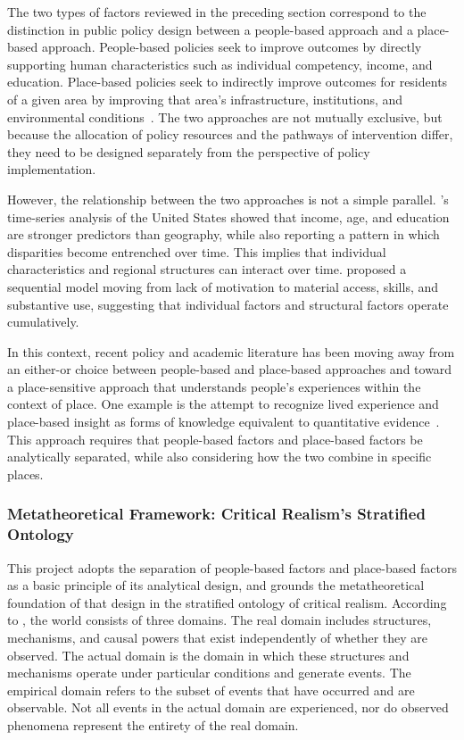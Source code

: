 The two types of factors reviewed in the preceding section correspond to the distinction in public policy design between a people-based approach and a place-based approach. People-based policies seek to improve outcomes by directly supporting human characteristics such as individual competency, income, and education. Place-based policies seek to indirectly improve outcomes for residents of a given area by improving that area's infrastructure, institutions, and environmental conditions~\citep{NeumarkSimpson2015}. The two approaches are not mutually exclusive, but because the allocation of policy resources and the pathways of intervention differ, they need to be designed separately from the perspective of policy implementation.

However, the relationship between the two approaches is not a simple parallel. \citet{Hindman2000}'s time-series analysis of the United States showed that income, age, and education are stronger predictors than geography, while also reporting a pattern in which disparities become entrenched over time. This implies that individual characteristics and regional structures can interact over time. \citet{vanDijk2020} proposed a sequential model moving from lack of motivation to material access, skills, and substantive use, suggesting that individual factors and structural factors operate cumulatively.

In this context, recent policy and academic literature has been moving away from an either-or choice between people-based and place-based approaches and toward a place-sensitive approach that understands people's experiences within the context of place. One example is the attempt to recognize lived experience and place-based insight as forms of knowledge equivalent to quantitative evidence~\citep{OECD2025}. This approach requires that people-based factors and place-based factors be analytically separated, while also considering how the two combine in specific places.

\subsubsection{Metatheoretical Framework: Critical Realism's Stratified Ontology}
\label{subsubsec:2-1-3}

This project adopts the separation of people-based factors and place-based factors as a basic principle of its analytical design, and grounds the metatheoretical foundation of that design in the stratified ontology of critical realism. According to \citet{Bhaskar1975}, the world consists of three domains. The real domain includes structures, mechanisms, and causal powers that exist independently of whether they are observed. The actual domain is the domain in which these structures and mechanisms operate under particular conditions and generate events. The empirical domain refers to the subset of events that have occurred and are observable. Not all events in the actual domain are experienced, nor do observed phenomena represent the entirety of the real domain.

